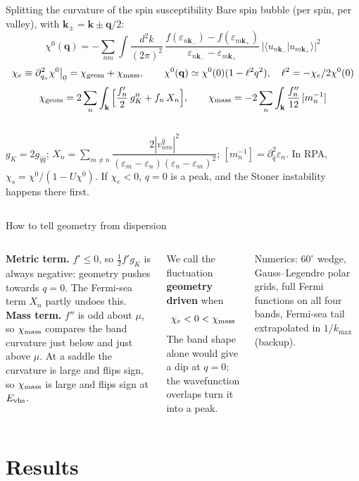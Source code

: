 \documentclass[aspectratio=169,11pt]{beamer}
\newcommand{\keybox}[1]{%
  \begin{center}\colorbox{boxbg}{\parbox{0.94\linewidth}{\vskip3pt\centering #1\vskip3pt}}\end{center}}
\newcommand{\bk}{\mathbf{k}}
\newcommand{\bq}{\mathbf{q}}
\newcommand{\chie}{\chi_{e}}
\newcommand{\chig}{\chi_{\rm geom}}
\newcommand{\chim}{\chi_{\rm mass}}
\newcommand{\Evhs}{E_{\rm vhs}}
\begin{document}
\begin{frame}{Splitting the curvature of the spin susceptibility}
\small
Bare spin bubble (per spin, per valley), with $\bk_\pm=\bk\pm\bq/2$:
\[
\chi^0(\bq)=-\sum_{nm}\int\!\frac{d^2k}{(2\pi)^2}\,
\frac{f(\varepsilon_{n\bk_-})-f(\varepsilon_{m\bk_+})}{\varepsilon_{n\bk_-}-\varepsilon_{m\bk_+}}
\,\big|\langle u_{n\bk_-}|u_{m\bk_+}\rangle\big|^2
\]
\[
\chie\equiv\partial_{q_x}^2\chi^0\big|_{0}=\chig+\chim,\qquad
\chi^0(\bq)\simeq\chi^0(0)(1-\ell^2q^2),\quad \ell^2=-\chie/2\chi^0(0)
\]
\[
\chig=2\sum_n\int_{\bk}\Big[\frac{f'_n}{2}\,g^n_K+f_n\,X_n\Big],\qquad
\chim=-2\sum_n\int_{\bk}\frac{f''_n}{12}\,[m_n^{-1}]
\]
\begin{columns}[T]
\footnotesize
$g_K=2g_{\hat q\hat q}$;\;
$X_n=\sum_{m\neq n}\dfrac{2|v^{\hat q}_{nm}|^2}{(\varepsilon_m-\varepsilon_n)(\varepsilon_n-\varepsilon_m)^2}$;\;
$[m_n^{-1}]=\partial_{\hat q}^2\varepsilon_n$.
\footnotesize
In RPA, $\chi_s=\chi^0/(1-U\chi^0)$. If $\chie<0$, $q=0$ is a peak, and the Stoner instability happens there first.
\end{columns}
\end{frame}

\begin{frame}{How to tell geometry from dispersion}
\begin{columns}[T]
\small
\textbf{Metric term.} $f'\le0$, so $\tfrac12f'g_K$ is always negative: geometry pushes towards $q=0$.
The Fermi-sea term $X_n$ partly undoes this.\\[8pt]
\textbf{Mass term.} $f''$ is odd about $\mu$, so $\chim$ compares the band curvature just below
and just above $\mu$. At a saddle the curvature is large and flips sign, so $\chim$ is large and flips sign at $\Evhs$.
\vskip6pt
\keybox{We call the fluctuation \textbf{geometry driven} when
\[\chie<0<\chim\]
\small The band shape alone would give a dip at $q=0$; the wavefunction overlaps turn it into a peak.}
\vskip4pt
{\scriptsize\color{muted}Numerics: $60^\circ$ wedge, Gauss--Legendre polar grids, full Fermi functions on all four bands, Fermi-sea tail extrapolated in $1/k_{\max}$ (backup).}
\end{columns}
\end{frame}

\section{Results}
\end{document}
